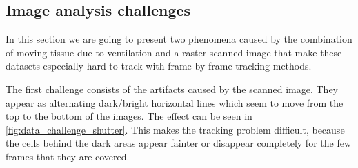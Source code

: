 	\subsection{Image analysis challenges}
	\label{sec:data_challenges}
	In this section we are going to present two phenomena caused by the combination of moving tissue due to ventilation and a raster scanned image that make these datasets especially hard to track with frame-by-frame tracking methods.
	
	The first challenge consists of the artifacts caused by the scanned image. They appear as alternating dark/bright horizontal lines which seem to move from the top to the bottom of the images. The effect can be seen in \cref{fig:data_challenge_shutter}. This makes the tracking problem difficult, because the cells behind the dark areas appear fainter or disappear completely for the few frames that they are covered.
		
